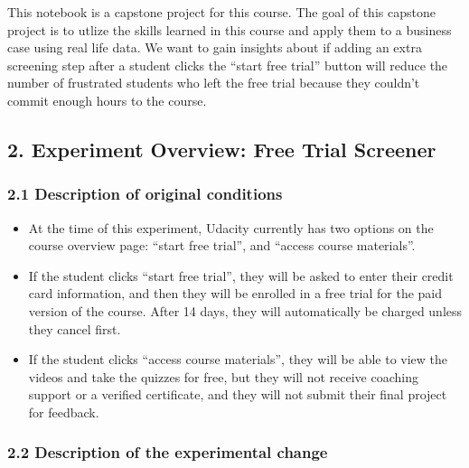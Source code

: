 \documentclass[11pt]{article}
\providecommand{\tightlist}{%
      \setlength{\itemsep}{0pt}\setlength{\parskip}{0pt}}
\begin{document}
    This notebook is a capstone project for this course. The goal of this
capstone project is to utlize the skills learned in this course and
apply them to a business case using real life data. We want to gain
insights about if adding an extra screening step after a student clicks
the ``start free trial'' button will reduce the number of frustrated
students who left the free trial because they couldn't commit enough
hours to the course.

    \hypertarget{experiment-overview-free-trial-screener}{%
\subsection{2. Experiment Overview: Free Trial
Screener}\label{experiment-overview-free-trial-screener}}

    \hypertarget{description-of-original-conditions}{%
\subsubsection{2.1 Description of original
conditions}\label{description-of-original-conditions}}

\begin{itemize}
\tightlist
\item
  At the time of this experiment, Udacity currently has two options on
  the course overview page: ``start free trial'', and ``access course
  materials''.
\item
  If the student clicks ``start free trial'', they will be asked to
  enter their credit card information, and then they will be enrolled in
  a free trial for the paid version of the course. After 14 days, they
  will automatically be charged unless they cancel first.
\item
  If the student clicks ``access course materials'', they will be able
  to view the videos and take the quizzes for free, but they will not
  receive coaching support or a verified certificate, and they will not
  submit their final project for feedback.
\end{itemize}

    \hypertarget{description-of-the-experimental-change}{%
\subsubsection{2.2 Description of the experimental
change}\label{description-of-the-experimental-change}}
\end{document}
